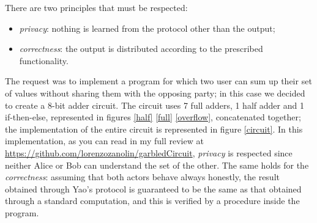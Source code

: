 \documentclass[12pt]{article}
\begin{document}
There are two principles that must be respected\cite{principles}: 
\begin{itemize}
    \item \textit{privacy}: nothing is learned from the protocol other than the output;
    \item \textit{correctness}: the output is distributed according to the prescribed functionality.
\end{itemize}

The request was to implement a program for which two user can sum up their set of values without sharing them with the opposing party; in this case we decided to create a 8-bit adder circuit.
The circuit uses 7 full adders, 1 half adder and 1 if-then-else, represented in figures \ref{half} \ref{full} \ref{overflow}, concatenated together; the implementation of the entire circuit is represented in figure \ref{circuit}.
In this implementation, as you can read in my full review at \url{https://github.com/lorenzozanolin/garbledCircuit}\label{zanoGit}, \textit{privacy} is respected since neither Alice or Bob can understand the set of the other. The same holds for the \textit{correctness}: assuming that both actors behave always honestly, the result obtained through Yao's protocol is guaranteed to be the same as that obtained through a standard computation, and this is verified by a procedure inside the program.
\end{document}
